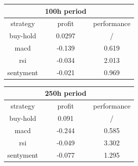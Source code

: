 \documentclass[a4paper,12pt]{report}
\begin{document}
\begin{fig}
\begin{fig}
\begin{subfigure}{\linewidth}
		\begin{tabular}{||c c c||}
			\hline\hline
			& \textbf{100h period} & \\
			\hline\hline
			strategy & profit & performance \\ [0.5ex] 
			\hline\hline
			buy-hold & 0.0297 & / \\
			\hline
			macd & -0.139 & 0.619 \\
			\hline
			rsi & -0.034 & 2.013 \\
			\hline
			sentyment & -0.021 & 0.969 \\ [1ex]
			\hline\hline
		\end{tabular}
		\begin{tabular}{||c c c ||} 
			\hline\hline
			& \textbf{250h period} & \\
			\hline\hline
			strategy & profit & performance \\ [0.5ex] 
			\hline\hline
			buy-hold & 0.091 & / \\
			\hline
			macd & -0.244 & 0.585 \\
			\hline
			rsi & -0.049 & 3.302 \\
			\hline
			sentyment & -0.077 & 1.295 \\ [1ex]
			\hline\hline
		\end{tabular}
	\end{subfigure}
	\label{Tabella 4}
\end{fig}


\end{fig}
\end{document}
